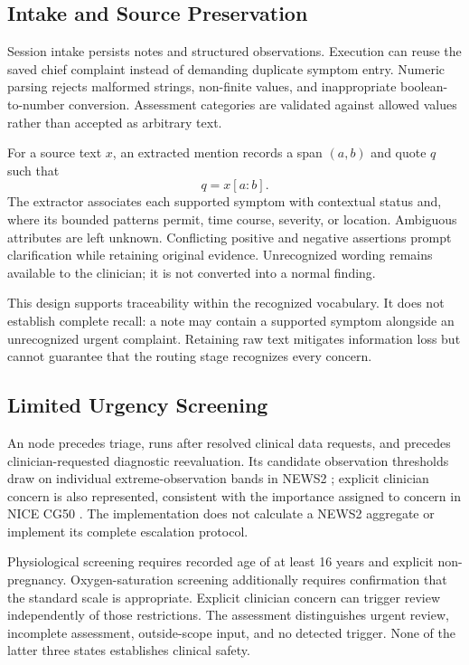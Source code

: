\documentclass[conference]{IEEEtran}
\newcommand{\code}[1]{\texttt{\detokenize{#1}}}
\begin{document}
\subsection{Intake and Source Preservation}
Session intake persists notes and structured observations. Execution can reuse the saved chief complaint instead of demanding duplicate symptom entry. Numeric parsing rejects malformed strings, non-finite values, and inappropriate boolean-to-number conversion. Assessment categories are validated against allowed values rather than accepted as arbitrary text.

For a source text $x$, an extracted mention records a span $(a,b)$ and quote $q$ such that
\begin{equation}
q=x[a:b].
\end{equation}
The extractor associates each supported symptom with contextual status and, where its bounded patterns permit, time course, severity, or location. Ambiguous attributes are left unknown. Conflicting positive and negative assertions prompt clarification while retaining original evidence. Unrecognized wording remains available to the clinician; it is not converted into a normal finding.

This design supports traceability within the recognized vocabulary. It does not establish complete recall: a note may contain a supported symptom alongside an unrecognized urgent complaint. Retaining raw text mitigates information loss but cannot guarantee that the routing stage recognizes every concern.

\subsection{Limited Urgency Screening}
An \code{urgency_check} node precedes triage, runs after resolved clinical data requests, and precedes clinician-requested diagnostic reevaluation. Its candidate observation thresholds draw on individual extreme-observation bands in NEWS2 \cite{news2}; explicit clinician concern is also represented, consistent with the importance assigned to concern in NICE CG50 \cite{cg50}. The implementation does not calculate a NEWS2 aggregate or implement its complete escalation protocol.

Physiological screening requires recorded age of at least 16 years and explicit non-pregnancy. Oxygen-saturation screening additionally requires confirmation that the standard scale is appropriate. Explicit clinician concern can trigger review independently of those restrictions. The assessment distinguishes urgent review, incomplete assessment, outside-scope input, and no detected trigger. None of the latter three states establishes clinical safety.
\end{document}
